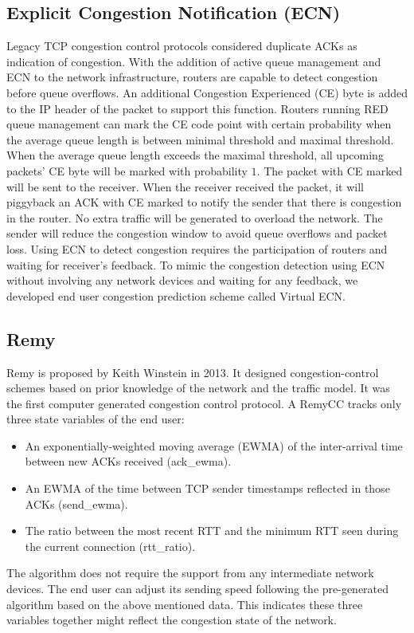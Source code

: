 \subsection{Explicit Congestion Notification (ECN)}
\par Legacy TCP congestion control protocols considered duplicate ACKs as indication of congestion. With the addition of active queue management and ECN \cite{ramakrishnan2001rfc} to the network infrastructure, routers are capable to detect congestion before queue overflows. An additional Congestion Experienced (CE) byte is added to the IP header of the packet to support this function. Routers running RED queue management can mark the CE code point with certain probability when the average queue length is between minimal threshold and maximal threshold. When the average queue length exceeds the maximal threshold, all upcoming packets' CE byte will be marked with probability $1$. The packet with CE marked will be sent to the receiver. When the receiver received the packet, it will piggyback an ACK with CE marked to notify the sender that there is congestion in the router. No extra traffic will be generated to overload the network. The sender will reduce the congestion window to avoid queue overflows and packet loss. Using ECN to detect congestion requires the participation of routers and waiting for receiver's feedback. To mimic the congestion detection using ECN without involving any network devices and waiting for any feedback, we developed end user congestion prediction scheme called Virtual ECN.
\subsection{Remy}
\par Remy \cite{winstein2013tcp} is proposed by Keith Winstein in 2013. It designed congestion-control schemes based on prior knowledge of the network and the traffic model. It was the first computer generated congestion control protocol. A RemyCC tracks only three state variables of the end user:
\begin{itemize}
\item An exponentially-weighted moving average (EWMA) of the inter-arrival time between new ACKs received (ack\_ewma).
\item An EWMA of the time between TCP sender timestamps reflected in those ACKs (send\_ewma).
\item The ratio between the most recent RTT and the minimum RTT seen during the current connection (rtt\_ratio).
\end{itemize}
The algorithm does not require the support from any intermediate network devices. The end user can adjust its sending speed following the pre-generated algorithm based on the above mentioned data. This indicates these three variables together might reflect the congestion state of the network. 


